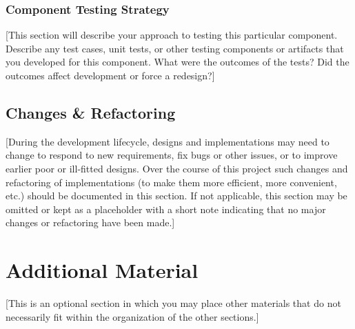 \documentclass[12pt]{scrartcl} %
\begin{document}
\subsubsection{Component Testing Strategy}

[This section will describe your approach to testing this particular component.  Describe any test cases, unit tests, or other testing components or artifacts that you developed for this component.  What were the outcomes of the tests?  Did the outcomes affect development or force a redesign?]

\subsection{Changes \& Refactoring}

[During the development lifecycle, designs and implementations may need to change to respond to new   requirements, fix bugs or other issues, or to improve earlier poor or ill-fitted designs.  Over the course of this project such changes and refactoring of implementations (to make them more efficient, more convenient, etc.) should be documented in this section.  If not applicable, this section may be omitted or kept as a placeholder with a short note indicating that no major changes or refactoring have been made.]

\section{Additional Material}

[This is an optional section in which you may place other materials that do not necessarily fit within the organization of the other sections.]

\nocite{*}

%

\end{document}
